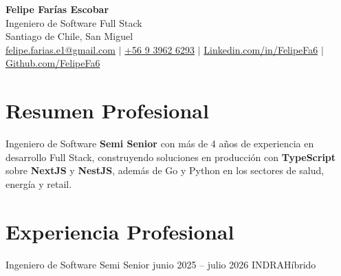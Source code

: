 








\begin{center}
        \textbf{\Huge Felipe Farías Escobar} \\
        \vspace{4pt}
        \small Ingeniero de Software Full Stack \\ \vspace{1pt}
        Santiago de Chile, San Miguel \\

        \href{mailto:felipe.farias.e1@gmail.com}{felipe.farias.e1@gmail.com} $|$
        \href{https://wa.me/56939626293}{+56 9 3962 6293} $|$
        \href{https://www.linkedin.com/in/FelipeFa6/}{Linkedin.com/in/FelipeFa6}
        $|$
        \href{https://github.com/FelipeFa6}{Github.com/FelipeFa6}
\end{center}

\vspace{-18pt}

\section{Resumen Profesional}

{\small
        Ingeniero de Software \textbf{Semi Senior} con más de 4 años de
        experiencia en desarrollo Full Stack, construyendo soluciones en
        producción con \textbf{TypeScript} sobre \textbf{NextJS} y
        \textbf{NestJS}, además de Go y Python en los sectores de salud,
        energía y retail.
}

\section{Experiencia Profesional}

\resumeSubHeadingListStart

\resumeSubheading
{Ingeniero de Software Semi Senior} {junio 2025 -- julio 2026}
{INDRA}{Híbrido}
\resumeItemListStart


